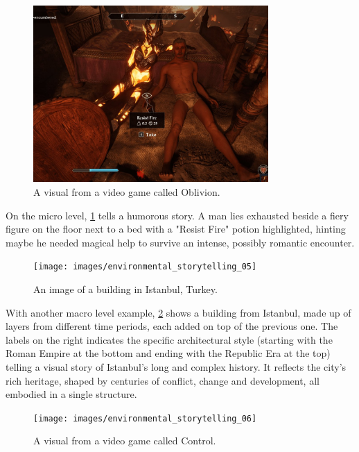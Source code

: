         \begin{figure}[H]
        \centering
        \includegraphics[width=0.8\textwidth]{images/environmental_storytelling_04}
        \caption{A visual from a video game called Oblivion.}
        \label{fig:ES_02}
        \end{figure}

        On the micro level, \ref{fig:ES_02} tells a humorous story. A man lies exhausted beside a fiery figure on the floor next to a bed with a "Resist Fire" potion highlighted, hinting maybe he needed magical help to survive an intense, possibly romantic encounter.\par

        \begin{figure}[H]
        \centering
        \texttt{[image: images/environmental\_storytelling\_05]}
        \caption{An image of a building in Istanbul, Turkey.}
        \label{fig:ES_03}
        \end{figure}

        With another macro level example, \ref{fig:ES_03} shows a building from Istanbul, made up of layers from different time periods, each added on top of the previous one. The labels on the right indicates the specific architectural style (starting with the Roman Empire at the bottom and ending with the Republic Era at the top) telling a visual story of Istanbul’s long and complex history. It reflects the city’s rich heritage, shaped by centuries of conflict, change and development, all embodied in a single structure.\par

        \begin{figure}[H]
        \centering
        \texttt{[image: images/environmental\_storytelling\_06]}
        \caption{A visual from a video game called Control.}
        \label{fig:ES_04}
        \end{figure}

